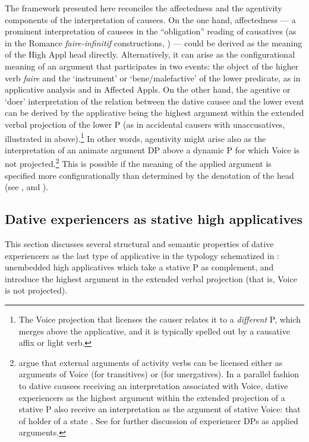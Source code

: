\documentclass[output=paper,colorlinks,citecolor=brown,modfonts,nonflat]{langsci/langscibook}
\begin{document}
The framework presented here reconciles the affectedness and the agentivity components of the interpretation of causees. On the one hand, affectedness — a prominent interpretation of causees in the “obligation” reading of causatives (as in the Romance \textit{faire-infinitif} constructions, \citealt{FolliHarley2007}) — could be derived as the meaning of the High Appl head directly. Alternatively, it can arise as the configurational meaning of an argument that participates in two events: the object of the higher verb \textit{faire} and the ‘instrument’ or ‘bene/malefactive’ of the lower predicate, as in  applicative analysis and in Affected Appls. On the other hand, the agentive or ‘doer’ interpretation of the relation between the dative causee and the lower event can be derived by the applicative being the highest argument within the extended verbal projection of the lower {\liv}P (as in accidental causers with unaccusatives, illustrated in  above).\footnote{The Voice projection that licenses the causer relates it to a \textit{different} {\liv}P, which merges above the applicative, and it is typically spelled out by a causative affix or light verb.} In other words, agentivity might arise also as the interpretation of an animate argument DP above a dynamic {\liv}P for which Voice is not projected.\footnote{\citet{TollanOxford2018} argue that external arguments of activity verbs can be licensed either as arguments of Voice (for transitives) or {\liv}(for unergatives). In a parallel fashion to dative causees receiving an interpretation associated with Voice, dative experiencers as the highest argument within the extended projection of a stative {\liv}P also receive an interpretation as the argument of stative Voice: that of holder of a state \citep{Kratzer1996}. See  for further discussion of experiencer DPs as applied arguments.} This is possible if the meaning of the applied argument is specified more configurationally than determined by the denotation of the head (see \citealt{Cuervo2015Chapter}, and \citealt{WoodMarantz2017}).

\subsection{Dative experiencers as stative high applicatives}\label{sec:cuervo:4.4}

This section discusses several structural and semantic properties of dative experiencers as the last type of applicative in the typology schematized in : unembedded high applicatives which take a stative {\liv}P as complement, and introduce the highest argument in the extended verbal projection (that is, Voice is not projected).
\end{document}
